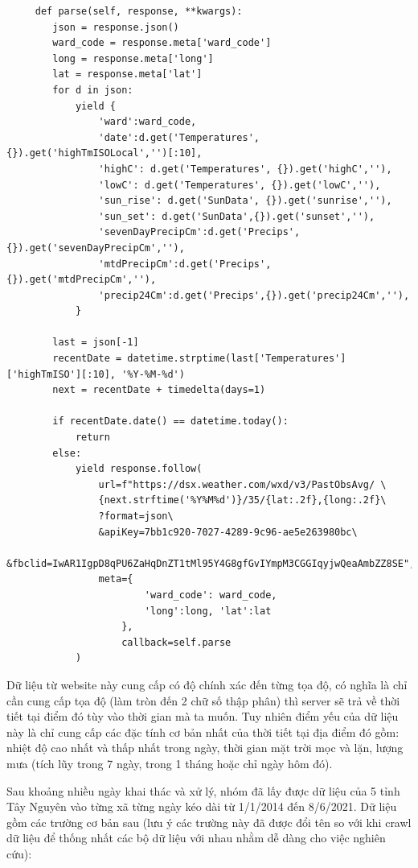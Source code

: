 \documentclass{article}
\begin{document}
\begin{verbatim}
	 def parse(self, response, **kwargs):
        json = response.json()
        ward_code = response.meta['ward_code']
        long = response.meta['long']
        lat = response.meta['lat']
        for d in json:
            yield {
                'ward':ward_code,
                'date':d.get('Temperatures', {}).get('highTmISOLocal','')[:10],
                'highC': d.get('Temperatures', {}).get('highC',''),
                'lowC': d.get('Temperatures', {}).get('lowC',''),
                'sun_rise': d.get('SunData', {}).get('sunrise',''),
                'sun_set': d.get('SunData',{}).get('sunset',''),
                'sevenDayPrecipCm':d.get('Precips',{}).get('sevenDayPrecipCm',''),
                'mtdPrecipCm':d.get('Precips',{}).get('mtdPrecipCm',''),
                'precip24Cm':d.get('Precips',{}).get('precip24Cm',''),
            }

		last = json[-1]
        recentDate = datetime.strptime(last['Temperatures']['highTmISO'][:10], '%Y-%M-%d')
        next = recentDate + timedelta(days=1)
		
		if recentDate.date() == datetime.today():
        	return
        else:
            yield response.follow(
                url=f"https://dsx.weather.com/wxd/v3/PastObsAvg/ \
				{next.strftime('%Y%M%d')}/35/{lat:.2f},{long:.2f}\
				?format=json\
				&apiKey=7bb1c920-7027-4289-9c96-ae5e263980bc\
				&fbclid=IwAR1IgpD8qPU6ZaHqDnZT1tMl95Y4G8gfGvIYmpM3CGGIqyjwQeaAmbZZ8SE",
                meta={
                        'ward_code': ward_code,
                        'long':long, 'lat':lat
                    },
                    callback=self.parse
            )
\end{verbatim}

Dữ liệu từ website này cung cấp có độ chính xác đến từng tọa độ, có nghĩa là chỉ cần cung cấp tọa độ (làm tròn đến 2 chữ số thập phân) thì server sẽ trả về thời tiết tại điểm đó tùy vào thời gian mà ta muốn. Tuy nhiên điểm yếu của dữ liệu này là chỉ cung cấp các đặc tính cơ bản nhất của thời tiết tại địa điểm đó gồm: nhiệt độ cao nhất và thấp nhất trong ngày, thời gian mặt trời mọc và lặn, lượng mưa (tích lũy trong 7 ngày, trong 1 tháng hoặc chỉ ngày hôm đó).

Sau khoảng nhiều ngày khai thác và xử lý, nhóm đã lấy được dữ liệu của 5 tỉnh Tây Nguyên vào từng xã từng ngày kéo dài từ 1/1/2014 đến 8/6/2021. Dữ liệu gồm các trường cơ bản sau (lưu ý các trường này đã được đổi tên so với khi crawl dữ liệu để thống nhất các bộ dữ liệu với nhau nhằm dễ dàng cho việc nghiên cứu):
\end{document}
